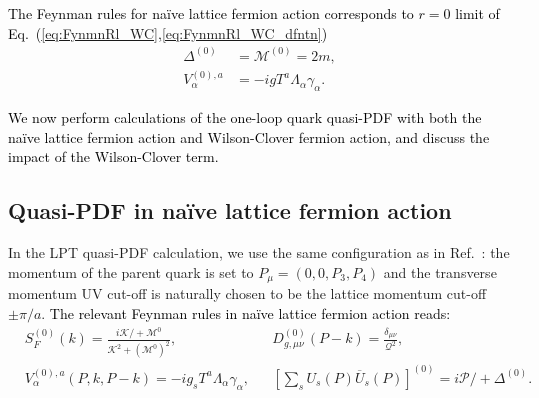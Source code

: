 \documentclass[english,preprint,aps,prd,showpacs,superscriptaddress,nofootinbib,tightenlines]{revtex4}
\newcommand{\bseq}{\begin{subequations}}
\newcommand{\eseq}{\end{subequations}}
\newcommand{\emphs}[1]{\textcolor{black}{#1}}
\newcommand{\emphz}[1]{\textcolor{black}{#1}}
\begin{document}
\emphz{The Feynman rules for na\"ive lattice fermion action corresponds to $r=0$ limit of Eq.~(\ref{eq:FynmnRl_WC},\ref{eq:FynmnRl_WC_dfntn})}
\bseq
\begin{align}
\varDelta^{(0)}&=\mathcal{M}^{(0)}=2m,\\
  V^{(0),a}_\alpha&=-igT^a\varLambda_\alpha\gamma_\alpha.
\end{align}
\eseq

\emphs{We now perform calculations of the one-loop quark quasi-PDF with both the na\"ive lattice fermion action and Wilson-Clover fermion action, and discuss the impact of the Wilson-Clover term.}


\subsection{Quasi-PDF in na\"ive lattice fermion action}

In the LPT quasi-PDF calculation, we use the same
configuration as in Ref.~\cite{Xiong:2013bka}: the momentum of the parent
quark is set to $P_{\mu}=\left(0,0,P_{3},P_{4}\right)$ and the transverse
momentum UV cut-off is naturally chosen to be the lattice momentum
cut-off $\pm\pi/a$. \emphs{The relevant Feynman rules in na\"ive lattice fermion action reads:}
\bseq
\begin{align}\label{eq:Oa0_prpgtr}
&S_F^{(0)}\left(k\right)=\frac{i\mathcal{K}\!\!\!\!/+\mathcal{M}^{0}}{\mathcal{K}^2+\left(\mathcal{M}^{0}\right)^2},
&&D_{g,\mu\nu}^{(0)}\left(P-k\right)=\frac{\delta_{\mu\nu}}{\mathcal{Q}^2},\\
&V_{\alpha}^{(0),a}\left(P,k,P-k\right)= -ig_{s}T^{a}\varLambda_{\alpha}\gamma_{\alpha},
&&\left[\sum_sU_s\left(P\right)\overline{U}_s\left(P\right)\right]^{(0)}= i\mathcal{P}\!\!\!\!/+\varDelta^{(0)}.
\end{align}
\eseq
\end{document}
